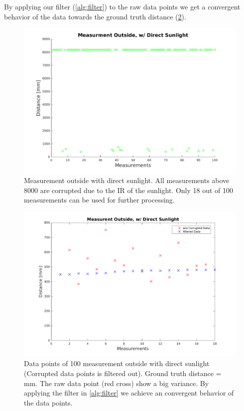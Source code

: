 By applying our filter  (\cref{alg:filter}) to the raw data points we get a convergent behavior of the data towards the ground truth distance (\cref{fig:meas_filter}).

\begin{figure}
	\centering
	\includegraphics[width=0.9\linewidth]{pictures/plot_meas_out.pdf}
	\caption{Measurement outside with direct sunlight. All measurements above 8000 are corrupted due to the IR of the sunlight. Only 18 out of 100 measurements can be used for further processing.}
	\label{fig:meas_out}
\end{figure}


\begin{figure}
	\centering
	\includegraphics[width=0.9\linewidth]{pictures/plot_filter_outside.pdf}
	\caption{Data points of 100 measurement outside with direct sunlight (Corrupted data points is filtered out). Ground truth distance = \unit[500]{mm}. The raw data point (red cross) show a big variance. By applying the filter in \cref{alg:filter} we achieve an convergent behavior of the data points.}
	\label{fig:meas_filter}
\end{figure}



